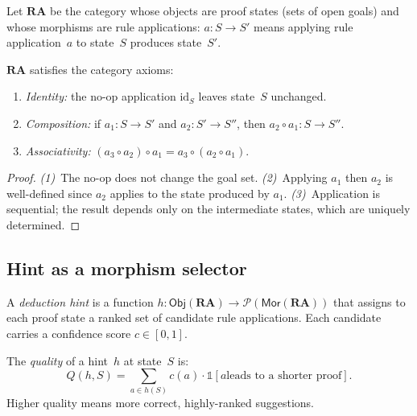 \documentclass[11pt]{article}
\begin{document}
\begin{definition}\label{def:racat}
Let $\mathbf{RA}$ be the category whose objects are proof
states (sets of open goals) and whose morphisms are rule
applications: $a \colon S \to S'$ means applying rule
application~$a$ to state~$S$ produces state~$S'$.
\end{definition}

\begin{lemma}\label{lem:cataxioms}
$\mathbf{RA}$ satisfies the category axioms:
\begin{enumerate}
\item \emph{Identity:} the no-op application $\mathrm{id}_S$
      leaves state~$S$ unchanged.
\item \emph{Composition:} if $a_1 \colon S \to S'$ and
      $a_2 \colon S' \to S''$, then
      $a_2 \circ a_1 \colon S \to S''$.
\item \emph{Associativity:} $(a_3 \circ a_2) \circ a_1 =
      a_3 \circ (a_2 \circ a_1)$.
\end{enumerate}
\end{lemma}
\begin{proof}
\emph{(1)}~The no-op does not change the goal set.
\emph{(2)}~Applying $a_1$ then $a_2$ is well-defined since
$a_2$ applies to the state produced by $a_1$.
\emph{(3)}~Application is sequential; the result depends only
on the intermediate states, which are uniquely determined.
\end{proof}

\subsection{Hint as a morphism selector}

\begin{definition}\label{def:dedhint}
A \emph{deduction hint} is a function
$h \colon \mathsf{Obj}(\mathbf{RA}) \to
\mathcal{P}(\mathsf{Mor}(\mathbf{RA}))$
that assigns to each proof state a ranked set of candidate
rule applications.  Each candidate carries a confidence
score $c \in [0,1]$.
\end{definition}

\begin{definition}\label{def:hintquality}
The \emph{quality} of a hint~$h$ at state~$S$ is:
\[
  Q(h, S) = \sum_{a \in h(S)} c(a) \cdot \mathbb{1}[\text{$a$
  leads to a shorter proof}].
\]
Higher quality means more correct, highly-ranked suggestions.
\end{definition}
\end{document}
